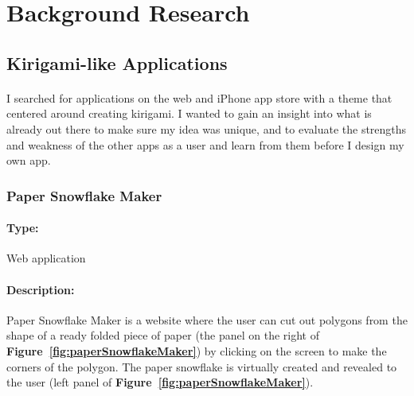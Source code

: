 \documentclass[11pt]{article}
\begin{document}
\newpage
\section{Background Research}

        \subsection{Kirigami-like Applications}
           \paragraph{}
            I searched for applications on the web and iPhone app store with a theme that centered around creating kirigami. I wanted to gain an insight into what is already out there to make sure my idea was unique, and to evaluate the strengths and weakness of the other apps as a user and learn from them before I design my own app. 
        
            \subsubsection{Paper Snowflake Maker}
            
                \paragraph{Type:} Web application %
                
                \paragraph{Description:}
                Paper Snowflake Maker is a website where the user can cut out polygons from the shape of a ready folded piece of paper (the panel on the right of \textbf{Figure~\ref{fig:paperSnowflakeMaker}}) by clicking on the screen to make the corners of the polygon. The paper snowflake is virtually created and revealed to the user (left panel of \textbf{Figure~\ref{fig:paperSnowflakeMaker}}).
                
\end{document}
